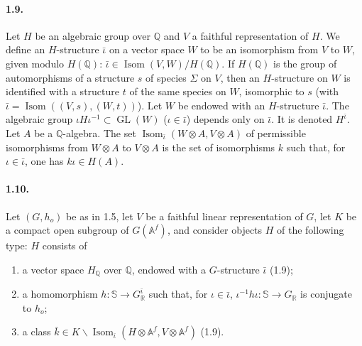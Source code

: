 \documentclass[10pt]{article}
\newcommand{\Af}{\mathbb A^f}
\newcommand{\Q}{\mathbb Q}
\newcommand{\R}{\mathbb R}
\newcommand{\bS}{\mathbb S}
\newcommand{\GL}{\operatorname{GL}}
\newcommand{\Isom}{\operatorname{Isom}}
\begin{document}
\paragraph{1.9.} Let $H$ be an algebraic group over $\Q$ and $V$ a faithful representation of $H$. We define an $H$-structure $\bar\iota$ on a vector space $W$ to be an isomorphism from $V$ to $W$, given modulo $H(\Q)$: $\bar\iota\in\Isom(V,W)/H(\Q)$. If $H(\Q)$ is the group of automorphisms of a structure $s$ of species $\Sigma$ on $V$, then an $H$-structure on $W$ is identified with a structure $t$ of the same species on $W$, isomorphic to $s$ (with $\bar\iota=\Isom((V,s),(W,t))$). Let $W$ be endowed with an $H$-structure $\bar\iota$. The algebraic group $\iota H\iota^{-1}\subset\GL(W)$ ($\iota\in\bar\iota$) depends only on $\bar\iota$. It is denoted $H^{\bar\iota}$. Let $A$ be a $\Q$-algebra. The set $\Isom_{\bar\iota}(W\otimes A,V\otimes A)$ of permissible isomorphisms from $W\otimes A$ to $V\otimes A$ is the set of isomorphisms $k$ such that, for $\iota\in\bar\iota$, one has $k\iota\in H(A)$.

\paragraph{1.10.} Let $(G,h_o)$ be as in 1.5, let $V$ be a faithful linear representation of $G$, let $K$ be a compact open subgroup of $G(\Af)$, and consider objects $H$ of the following type: $H$ consists of
\begin{enumerate}[label=(\alph*),leftmargin=2.6em]
\item a vector space $H_\Q$ over $\Q$, endowed with a $G$-structure $\bar\iota$ (1.9);
\item a homomorphism $h:\bS\to G^{\bar\iota}_\R$ such that, for $\iota\in\bar\iota$, $\iota^{-1}h\iota:\bS\to G_\R$ is conjugate to $h_o$;
\item a class $\bar k\in K\backslash\Isom_{\bar\iota}(H\otimes\Af,V\otimes\Af)$ (1.9).
\end{enumerate}
\end{document}
